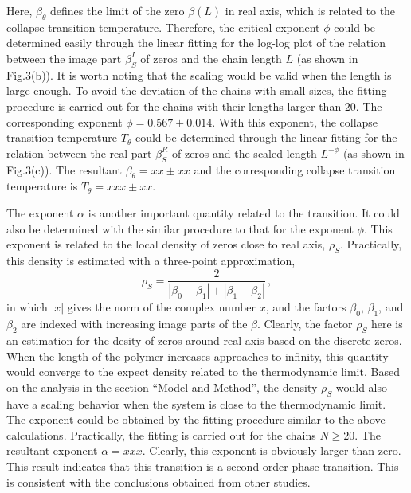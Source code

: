 \documentclass[preprint,preprintnumbers,amsmath,amssymb,showpacs,aps,pre]{revtex4-1}
\begin{document}
Here,
$\beta_{\theta}$ defines the limit of the zero $\beta(L)$ in real axis, which
is related to the collapse transition temperature. Therefore, the critical
exponent $\phi$ could be determined easily through the linear fitting for the
log-log plot of the relation between the image part $\beta_S^I$ of zeros and
the chain length $L$ (as shown in Fig.3(b)). It is worth noting that the
scaling would be valid when the length is large enough. To avoid the deviation
of the chains with small sizes, the fitting procedure is carried out for the
chains with their lengths larger than $20$. The corresponding exponent
$\phi=0.567 \pm 0.014$. With this exponent, the collapse transition temperature
$T_{\theta}$ could be determined through the linear fitting for the relation
between the real part $\beta_S^R$ of zeros and the scaled length $L^{-\phi}$
(as shown in Fig.3(c)). The resultant $\beta_{\theta}=xx \pm xx$ and the
corresponding collapse transition temperature is $T_{\theta}=xxx \pm xx$.

The exponent $\alpha$ is another important quantity related to the transition.
It could also be determined with the similar procedure to that for the
exponent $\phi$. This exponent is related to the local density of zeros close
to real axis, $\rho_S$. Practically, this density is estimated with a
three-point approximation,
\begin{equation}
\rho_S=\frac{2}{|\beta_0-\beta_1|+|\beta_1-\beta_2|} \, ,
\end{equation}
in which $|x|$ gives the norm of the complex number $x$, and the factors
$\beta_0$, $\beta_1$, and $\beta_2$ are indexed with increasing image parts of
the $\beta$. Clearly, the factor $\rho_S$ here is an estimation for the desity
of zeros around real axis based on the discrete zeros. When the length of the
polymer increases approaches to infinity, this quantity would converge to
the expect density related to the thermodynamic limit. Based on the analysis
in the section ``Model and Method'', the density $\rho_S$ would also have a
scaling behavior when the system is close to the thermodynamic limit. The
exponent could be obtained by the fitting procedure similar to the above
calculations. Practically, the fitting is carried out for the chains $N\ge
20$. The resultant exponent $\alpha=xxx$. Clearly, this exponent is obviously
larger than zero. This result indicates that this transition is a second-order
phase transition. This is consistent with the conclusions obtained from other
studies.
\end{document}
